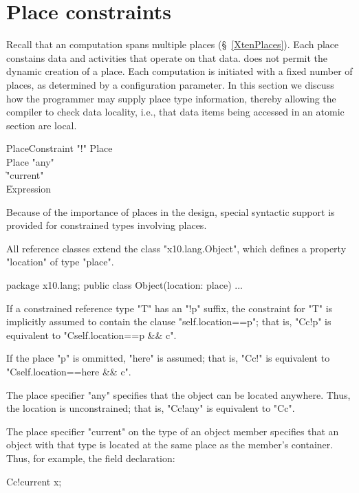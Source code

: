 \section{Place constraints}\label{PlaceTypes}
\label{DepType:PlaceType}

Recall that an \Xten{} computation spans multiple places
(\S~\ref{XtenPlaces}). Each place constains data and activities that
operate on that data.  \XtenCurrVer{} does not permit the dynamic
creation of a place. Each \Xten{} computation is initiated with a
fixed number of places, as determined by a configuration parameter.
In this section we discuss how the programmer may supply place type
information, thereby allowing the compiler to check data locality,
i.e., that data items being accessed in an atomic section are local.

\begin{grammar}
PlaceConstraint     \: \xcd"!" Place\opt \\
Place              \:  \xcd"any" \\
                        \| \xcd"current" \\
                        \| Expression \\
\end{grammar}

Because of the importance of places in the \Xten{} design, special
syntactic support is provided for constrained types involving places.

All \Xten{} reference classes extend the class
\xcd"x10.lang.Object", which defines a property
\xcd"location" of type
\xcd"place".

\begin{xten}
package x10.lang;
public class Object(location: place) { ... }  
\end{xten}

If a constrained reference type \xcd"T" has an \xcd"!p" suffix,
the constraint for \xcd"T" is implicitly assumed to contain the clause
\xcd"self.location==p"; that is,
\xcd"C{c}!p" is equivalent to \xcd"C{self.location==p && c}".

If the place \xcd"p" is ommitted, \xcd"here" is assumed; that is,
\xcd"C{c}!" is equivalent to \xcd"C{self.location==here && c}".

The place specifier \xcd"any" specifies that the object can be
located anywhere.  Thus, the location is unconstrained; that is,
\xcd"C{c}!any" is equivalent to \xcd"C{c}".

The place specifier \xcd"current" on the type of an object
member specifies that an object with that type is located at the
same place as the member's container.
Thus, for example, the field declaration:
\begin{xten}
    C{c}!current x;
\end{xten}

